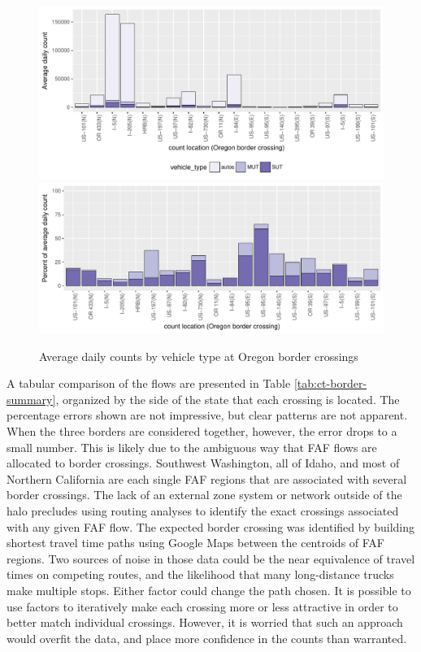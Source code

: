 \begin{figure}
\centering
\includegraphics[width=6.3in]{ct/BorderSummary1.pdf}
\includegraphics[width=6in]{ct/BorderSummary2.pdf}
\caption{Average daily counts by vehicle type at Oregon border crossings}
\label{fig:ct-border-flows}
\end{figure}

A tabular comparison of the flows are presented in Table \ref{tab:ct-border-summary}, organized by the side of the state that each crossing is located. The percentage errors shown are not impressive, but clear patterns are not apparent. When the three borders are considered together, however, the error drops to a small number. This is likely due to the ambiguous way that FAF flows are allocated to border crossings. Southwest Washington, all of Idaho, and most of Northern California are each single FAF regions that are associated with several border crossings. The lack of an external zone system or network outside of the halo precludes using routing analyses to identify the exact crossings associated with any given FAF flow. The expected border crossing was identified by building shortest travel time paths using Google Maps between the centroids of FAF regions. Two sources of noise in those data could be the near equivalence of travel times on competing routes, and the likelihood that many long-distance trucks make multiple stops. Either factor could change the path chosen. It is possible to use factors to iteratively make each crossing more or less attractive in order to better match individual crossings. However, it is worried that such an approach would overfit the data, and place more confidence in the counts than warranted.

